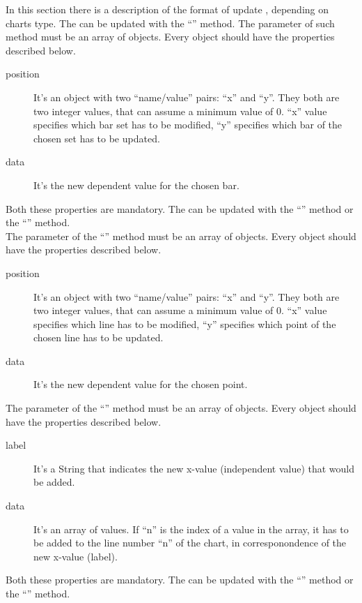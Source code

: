 			In this section there is a description of the format of update , depending on charts type. 
				The  can be updated with the “” method. The parameter of such method must be an array of objects. Every object should have the properties described below.
				\begin{description}
					\item[position] It's an object with two “name/value” pairs: “x” and “y”. They both are two integer values, that can assume a minimum value of 0. “x” value specifies which bar set has to be modified, “y” specifies which bar of the chosen set has to be updated.
					\item[data] It's the new dependent value for the chosen bar.
				\end{description}
				Both these properties are mandatory.
				The  can be updated with the “” method or the “” method.\\
				The parameter of the “” method must be an array of objects. Every object should have the properties described below.
				\begin{description}
					\item[position] It's an object with two “name/value” pairs: “x” and “y”. They both are two integer values, that can assume a minimum value of 0. “x” value specifies which line has to be modified, “y” specifies which point of the chosen line has to be updated.
					\item[data] It's the new dependent value for the chosen point.
				\end{description}
				The parameter of the “” method must be an array of objects. Every object should have the properties described below.
				\begin{description}
					\item[label] It's a String that indicates the new x-value (independent value) that would be added.
					\item[data] It's an array of values. If “n” is the index of a value in the array, it has to be added to the line number “n” of the chart, in corresponondence of the new x-value (label).
				\end{description}
				Both these properties are mandatory.
				The  can be updated with the “” method or the “” method.\\

